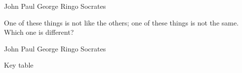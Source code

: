 \documentclass[answers,addpoints]{exam}
\begin{document}
\begin{questions}
\begin{randomizeoneparcheckboxes}[nokeeplast]
\choice John
\choice Paul
\choice George
\choice Ringo
\CorrectChoice Socrates
\end{randomizeoneparcheckboxes}

\question[5]
One of these things is not like the others; one of these
things is not the same. Which one is different?

\begin{oneparcheckboxes}%
\choice John
\choice Paul
\choice George
\choice Ringo
\CorrectChoice Socrates
\end{oneparcheckboxes}


\end{questions}

\hrulefill

Key table

\printkeytable

\writekeylist{\mykeylist}
\end{document}
